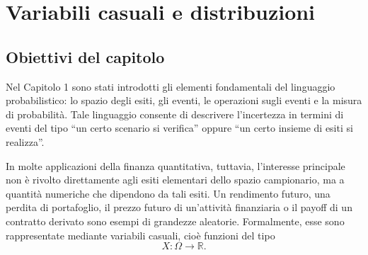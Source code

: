 


\chapter{Variabili casuali e distribuzioni}

\section{Obiettivi del capitolo}

\label{sec:cap2-obiettivi}

Nel Capitolo 1 sono stati introdotti gli elementi fondamentali del linguaggio
probabilistico: lo spazio degli esiti, gli eventi, le operazioni sugli eventi
e la misura di probabilit\`{a}. Tale linguaggio consente di descrivere
l'incertezza in termini di eventi del tipo ``un certo scenario si verifica''
oppure ``un certo insieme di esiti si realizza''.

In molte applicazioni della finanza quantitativa, tuttavia, l'interesse
principale non \`{e} rivolto direttamente agli esiti elementari dello spazio
campionario, ma a quantit\`{a} numeriche che dipendono da tali esiti. Un
rendimento futuro, una perdita di portafoglio, il prezzo futuro di
un'attivit\`{a} finanziaria o il payoff di un contratto derivato sono esempi
di grandezze aleatorie. Formalmente, esse sono rappresentate mediante
variabili casuali, cio\`{e} funzioni del tipo
\[
X:\Omega\longrightarrow\mathbb{R}.
\]



